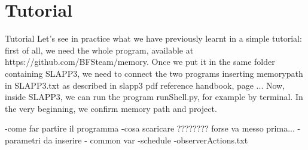 ﻿\section{Tutorial}
Tutorial
Let's see in practice what we  have previously learnt in a simple tutorial: first of all, we need the whole program, available at https://github.com/BFSteam/memory.
Once we put it in the same folder containing SLAPP3, we need to connect the two programs inserting memory\src path in  SLAPP3\project.txt as described in  slapp3 pdf reference handbook, page ...
Now, inside SLAPP3, we can run the program runShell.py, for example by terminal.
In the very beginning, we confirm memory path and project.




 




-come far partire il programma
-cosa scaricare ???????? forse va messo prima... 
- parametri da inserire
- common var
-schedule
-observerActions.txt